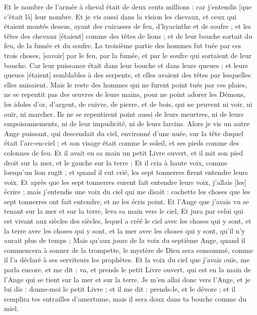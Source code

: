 \begin{multicols}{2}
Et le nombre de l'armée à cheval était de deux cents millions : car j'entendis [que c'était là] leur nombre.
Et je vis aussi dans la vision les chevaux, et ceux qui étaient montés dessus, ayant des cuirasses de feu, d'hyacinthe et de soufre ; et les têtes des chevaux [étaient] comme des têtes de lions ; et de leur bouche sortait du feu, de la fumée et du soufre.
La troisième partie des hommes fut tuée par ces trois choses, [savoir] par le feu, par la fumée, et par le soufre qui sortaient de leur bouche.
Car leur puissance était dans leur bouche et dans leurs queues ; et leurs queues [étaient] semblables à des serpents, et elles avaient des têtes par lesquelles elles nuisaient.
Mais le reste des hommes qui ne furent point tués par ces plaies, ne se repentit pas des œuvres de leurs mains, pour ne point adorer les Démons, les idoles d'or, d'argent, de cuivre, de pierre, et de bois, qui ne peuvent ni voir, ni ouïr, ni marcher.
Ils ne se repentirent point aussi de leurs meurtres, ni de leurs empoisonnements, ni de leur impudicité, ni de leurs larcins.
\VerseOne{}Alors je vis un autre Ange puissant, qui descendait du ciel, environné d'une nuée, sur la tête duquel était l'arc-en-ciel ; et son visage était comme le soleil, et ses pieds comme des colonnes de feu.
Et il avait en sa main un petit Livre ouvert, et il mit son pied droit sur la mer, et le gauche sur la terre ;
Et il cria à haute voix, comme lorsqu'un lion rugit ; et quand il eut crié, les sept tonnerres firent entendre leurs voix.
Et après que les sept tonnerres eurent fait entendre leurs voix, j'allais [les] écrire ; mais j'entendis une voix du ciel qui me disait : cachette les choses que les sept tonnerres ont fait entendre, et ne les écris point.
Et l'Ange que j'avais vu se tenant sur la mer et sur la terre, leva sa main vers le ciel,
Et jura par celui qui est vivant aux siècles des siècles, lequel a créé le ciel avec les choses qui y sont, et la terre avec les choses qui y sont, et la mer avec les choses qui y sont, qu'il n'y aurait plus de temps ;
Mais qu'aux jours de la voix du septième Ange, quand il commencera à sonner de la trompette, le mystère de Dieu sera consommé, comme il l'a déclaré à ses serviteurs les prophètes.
Et la voix du ciel que j'avais ouïe, me parla encore, et me dit : va, et prends le petit Livre ouvert, qui est en la main de l'Ange qui se tient sur la mer et sur la terre.
Je m'en allai donc vers l'Ange, et je lui dis : donne-moi le petit Livre ; et il me dit : prends-le, et le dévore ; et il remplira tes entrailles d'amertume, mais il sera doux dans ta bouche comme du miel.

\end{multicols}
